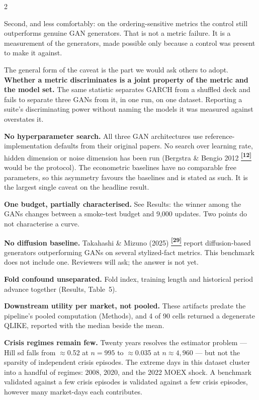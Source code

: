 \documentclass[10pt]{article}
\newcommand{\redbox}[2]{\begin{tcolorbox}[mybox={DRed}{RBg},title={#1}]#2\end{tcolorbox}}
\newcommand{\tcite}[1]{%
  \hyperlink{R:#1}{\textsuperscript{\scriptsize\textbf{[#1]}}}}
\begin{document}
\begin{multicols}{2}
{Second, and less comfortably: on the ordering-sensitive metrics the control still outperforms genuine GAN generators. That is not a metric failure. It is a measurement of the generators, made possible only because a control was present to make it against.

\smallskip
The general form of the caveat is the part we would ask others to adopt. \textbf{Whether a metric discriminates is a joint property of the metric and the model set.} The same statistic separates GARCH from a shuffled deck and fails to separate three GANs from it, in one run, on one dataset. Reporting a suite's discriminating power without naming the models it was measured against overstates it.}

\columnbreak

\redbox{Limitations}{%
\textbf{No hyperparameter search.} All three GAN architectures use reference-implementation defaults from their original papers. No search over learning rate, hidden dimension or noise dimension has been run (Bergstra \& Bengio 2012\tcite{12} would be the protocol). The econometric baselines have no comparable free parameters, so this asymmetry favours the baselines and is stated as such. It is the largest single caveat on the headline result.

\textbf{One budget, partially characterised.} See Results: the winner among the GANs changes between a smoke-test budget and 9,000 updates. Two points do not characterise a curve.

\textbf{No diffusion baseline.} Takahashi \& Mizuno (2025)\tcite{29} report diffusion-based generators outperforming GANs on several stylized-fact metrics. This benchmark does not include one. Reviewers will ask; the answer is not yet.

\textbf{Fold confound unseparated.} Fold index, training length and historical period advance together (Results, Table~5).

\textbf{Downstream utility per market, not pooled.} These artifacts predate the pipeline's pooled computation (Methods), and 4 of 90 cells returned a degenerate QLIKE, reported with the median beside the mean.

\textbf{Crisis regimes remain few.} Twenty years resolves the estimator problem --- Hill sd falls from $\approx$0.52 at $n=995$ to $\approx$0.035 at $n\approx4{,}960$ --- but not the sparsity of independent crisis episodes. The extreme days in this dataset cluster into a handful of regimes: 2008, 2020, and the 2022 MOEX shock. A benchmark validated against a few crisis episodes is validated against a few crisis episodes, however many market-days each contributes.

}
\end{multicols}
\end{document}
